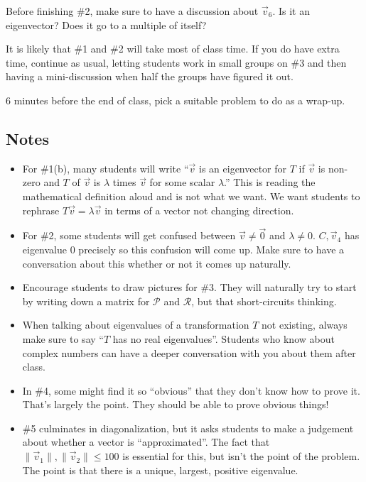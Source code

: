 \documentclass[red]{tutorial}
\theoremstyle{definition}
\theoremstyle{theorem}
\begin{document}
{\begin{instructions}
  Before finishing \#2, make sure to have a discussion about $\vec v_6$. Is it an eigenvector?
  Does it go to a multiple of itself?

  It is likely that \#1 and \#2 will take most of class time. If you do have extra time, continue as usual,
  letting students work in small groups on \#3 and then having a mini-discussion when half the groups
  have figured it out.

  6 minutes before the end of class, pick a suitable problem to do as a wrap-up.


  \subsection*{Notes}
  \begin{itemize}
    \item For \#1(b), many students will write ``$\vec v$ is an eigenvector for $T$ if
      $\vec v$ is non-zero and $T$ of $\vec v$ is $\lambda$ times $\vec v$ for some scalar
      $\lambda$.'' This is reading the mathematical definition aloud and is not what we want.
      We want students to rephrase $T\vec v=\lambda \vec v$ in terms of a vector not changing
      direction.
    \item For \#2, some students will get confused between $\vec v\neq \vec 0$ and $\lambda \neq 0$.
      $C,\vec v_4$ has eigenvalue $0$ precisely so this confusion will come up. Make sure to
      have a conversation about this whether or not it comes up naturally.
    \item Encourage students to draw pictures for \#3. They will naturally try to start by writing
      down a matrix for $\mathcal P$ and $\mathcal R$, but that short-circuits thinking.
    \item
      When talking about eigenvalues of a transformation $T$
      not existing, always make sure to say ``$T$ has no real eigenvalues''. Students who
      know about complex numbers can have a deeper conversation with you about them after class.
    \item In \#4, some might find it so ``obvious'' that they don't know how to prove it. That's largely
      the point. They should be able to prove obvious things!
    \item \#5 culminates in diagonalization, but it asks students to make a judgement about whether
      a vector is ``approximated''. The fact that $\|\vec v_1\|,\|\vec v_2\|\leq 100$ is essential
      for this, but isn't the point of the problem. The point is that there is a unique, largest, positive
      eigenvalue.
  \end{itemize}
\end{instructions}
}
\end{document}
